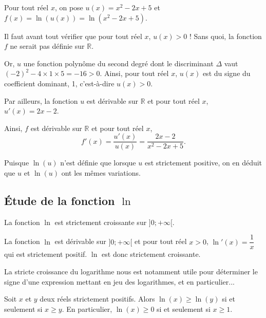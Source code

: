 \documentclass[11pt,fleqn, openany]{book} %
\begin{document}
\begin{example}Pour tout réel $x$, on pose $u(x)=x^2-2x+5$ et  $f(x)=\ln(u(x))=\ln(x^2-2x+5)$.

Il faut avant tout vérifier que pour tout réel $x$, $u(x)>0$ ! Sans quoi, la fonction $f$ ne serait pas définie sur $\mathbb{R}$.

Or, $u$ une fonction polynôme du second degré dont le discriminant $\Delta$ vaut $(-2)^2-4\times 1 \times 5 = -16>0$. Ainsi, pour tout réel $x$, $u(x)$ est du signe du coefficient dominant, 1, c'est-à-dire $u(x)>0$.

Par ailleurs, la fonction $u$ est dérivable sur $\mathbb{R}$ et pour tout réel $x$, $u'(x)=2x-2$.

Ainsi, $f$ est dérivable sur $\mathbb{R}$ et pour tout réel $x$, 
\[ f'(x)=\dfrac{u'(x)}{u(x)}=\dfrac{2x-2}{x^2-2x+5}.\]
\end{example}

Puisque $\ln(u)$ n'est définie que lorsque $u$ est strictement positive, on en déduit que $u$ et $\ln(u)$ ont les mêmes variations.
\newpage
\subsection{Étude de la fonction $\ln$}

\begin{proposition}La fonction $\ln$ est strictement croissante sur $]0;+\infty [$.\end{proposition}

\begin{demonstration}La fonction $\ln$ est dérivable sur $]0;+\infty[$ et pour tout réel $x>0$, $\ln'(x)=\dfrac{1}{x}$ qui est strictement positif. $\ln$ est donc strictement croissante.\end{demonstration}

La stricte croissance du logarithme nous est notamment utile pour déterminer le signe d'une expression mettant en jeu des logarithmes, et en particulier...

\begin{proposition}Soit $x$ et $y$ deux réels strictement positifs. Alors $\ln(x)\geqslant\ln(y)$ si et seulement si $x\geqslant y$.
En particulier, $\ln(x) \geqslant 0$ si et seulement si $x\geqslant 1$.\end{proposition}
\end{document}
